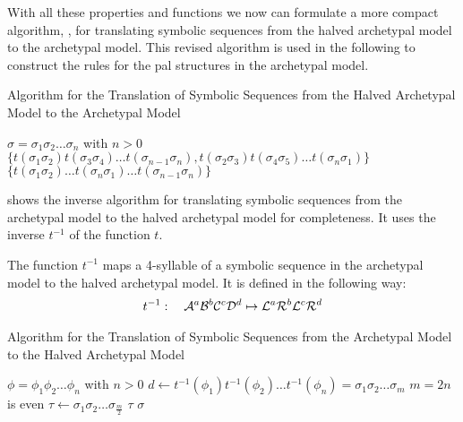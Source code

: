 With all these properties and functions we now can formulate a more compact algorithm, , for translating symbolic sequences from the halved archetypal model to the archetypal model.
This revised algorithm is used in the following to construct the rules for the \gls{pal} structures in the archetypal model.

\begin{algorithm}
	\caption{Algorithm for the Translation of Symbolic Sequences from the Halved Archetypal Model to the Archetypal Model}
	\label{alg:halved.to.full}
	\begin{algorithmic}
		\Require $\sigma = \sigma_1\sigma_2 \dots \sigma_n$ with $n > 0$
		\State \Return $\{t(\sigma_1\sigma_2) t(\sigma_3\sigma_4) \dots t(\sigma_{n-1}\sigma_n), t(\sigma_2\sigma_3) t(\sigma_4\sigma_5) \dots t(\sigma_n\sigma_1)\}$
		\Else
		\State \Return $\{t(\sigma_1\sigma_2) \dots t(\sigma_{n}\sigma_1) \dots t(\sigma_{n-1}\sigma_n)\}$
		\EndIf
	\end{algorithmic}
\end{algorithm}

 shows the inverse algorithm for translating symbolic sequences from the archetypal model to the halved archetypal model for completeness.
It uses the inverse $t^{-1}$ of the function $t$.

\begin{definition}
	The function $t^{-1}$ maps a 4-syllable of a symbolic sequence in the archetypal model to the halved archetypal model.
	It is defined in the following way:
	\begin{align}
		t^{-1}: \quad \mathcal{A}^a\mathcal{B}^b\mathcal{C}^c\mathcal{D}^d \mapsto \mathcal{L}^a\mathcal{R}^b\mathcal{L}^c\mathcal{R}^d
	\end{align}
\end{definition}

\begin{algorithm}
	\caption{Algorithm for the Translation of Symbolic Sequences from the Archetypal Model to the Halved Archetypal Model}
	\label{alg:full.to.halved}
	\begin{algorithmic}
		\Require $\phi = \phi_1\phi_2 \dots \phi_n$ with $n > 0$
		\State $d \gets t^{-1}(\phi_1)t^{-1}(\phi_2) \dots t^{-1}(\phi_n) = \sigma_1\sigma_2 \dots \sigma_m$
		\Comment $m = 2n$ is even
		\State $\tau \gets \sigma_1\sigma_2 \dots \sigma_{\frac{m}{2}}$
		\If{$\sigma = \tau^2$}
		\State \Return $\tau$
		\Else
		\State \Return $\sigma$
		\EndIf
	\end{algorithmic}
\end{algorithm}

